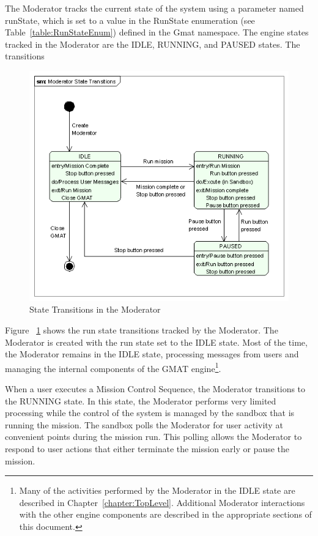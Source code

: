 The Moderator tracks the current state of the system using a parameter named runState, which is set
to a value in the RunState enumeration (see Table~\ref{table:RunStateEnum}) defined in the Gmat
namespace.  The engine states tracked in the Moderator are the IDLE, RUNNING, and PAUSED states.
The transitions

\begin{figure}[htb]
\begin{center}
\includegraphics[260,231]{Images/ModeratorStateTransitions.png}
\caption{State Transitions in the Moderator}
\label{figure:ModeratorStateTransitions}
\end{center}
\end{figure}

Figure ~\ref{figure:ModeratorStateTransitions} shows the run state transitions tracked by the
Moderator.  The Moderator is created with the run state set to the IDLE state.  Most of the time,
the Moderator remains in the IDLE state, processing messages from users and managing the internal
components of the GMAT engine\footnote{Many of the activities performed by the Moderator in the IDLE
state are described in Chapter~\ref{chapter:TopLevel}.  Additional Moderator interactions with the
other engine components are described in the appropriate sections of this document.}.

When a user executes a Mission Control Sequence, the Moderator transitions to the RUNNING state.  In
this state, the Moderator performs very limited processing while the control of the system is
managed by the sandbox that is running the mission.  The sandbox polls the Moderator for user
activity at convenient points during the mission run.  This polling allows the Moderator to respond
to user actions that either terminate the mission early or pause the mission.

